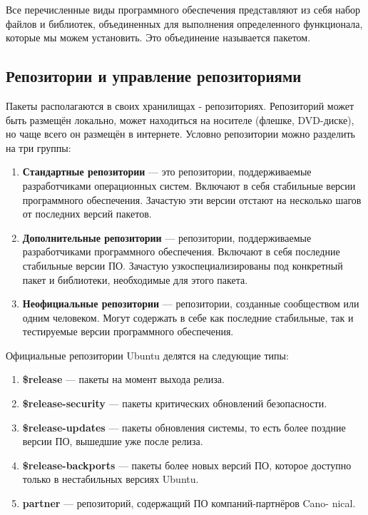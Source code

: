 \documentclass[14pt, a4paper]{article}
\begin{document}
Все перечисленные виды программного обеспечения представляют из себя набор файлов и
библиотек, объединенных для выполнения определенного функционала, которые мы можем
установить. Это объединение называется пакетом.

\subsection*{Репозитории и управление репозиториями} 

Пакеты располагаются в своих хранилищах - репозиториях. Репозиторий может быть размещён
локально, может находиться на носителе (флешке, DVD-диске), но чаще всего он размещён в
интернете. Условно репозитории можно разделить на три группы:

\begin{enumerate}
    \item \textbf{Стандартные репозитории} — это репозитории, поддерживаемые разработчиками
    операционных систем. Включают в себя стабильные версии программного обеспечения.
    Зачастую эти версии отстают на несколько шагов от последних версий пакетов.
    \item \textbf{Дополнительные репозитории} — репозитории, поддерживаемые разработчиками
    программного обеспечения. Включают в себя последние стабильные версии ПО. Зачастую
    узкоспециализированы под конкретный пакет и библиотеки, необходимые для этого пакета.
    \item \textbf{Неофициальные репозитории} — репозитории, созданные сообществом или одним
    человеком. Могут содержать в себе как последние стабильные, так и тестируемые версии
    программного обеспечения.
\end{enumerate}

\noindent Официальные репозитории Ubuntu делятся на следующие типы:
\begin{enumerate}
    \item \textbf{\$release} — пакеты на момент выхода релиза.
    \item \textbf{\$release-security} — пакеты критических обновлений безопасности.
    \item \textbf{\$release-updates} — пакеты обновления системы, то есть более поздние версии ПО,
    вышедшие уже после релиза.
    \item \textbf{\$release-backports} — пакеты более новых версий ПО, которое доступно только в
    нестабильных версиях Ubuntu.
    \item \textbf{partner} — репозиторий, содержащий ПО компаний-партнёров Cano- nical.
\end{enumerate}
\end{document}
